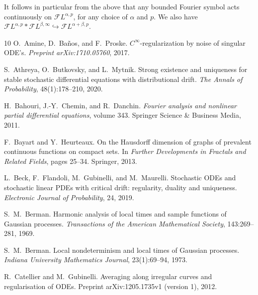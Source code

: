 \documentclass[10pt]{article}
\newcommand{\tmtextit}[1]{{\itshape{#1}}}
\begin{document}
It follows in particular from the above that any bounded Fourier symbol acts
continuously on $\mathcal{F} L^{\alpha, p}$, for any choice of $\alpha$ and
$p$. We also have $\mathcal{F} L^{\alpha, p} \ast \mathcal{F} L^{\beta,
\infty} \hookrightarrow \mathcal{F} L^{\alpha + \beta, p}$.

\begin{thebibliography}{10}
  O.~Amine, D.~Ba{\~n}os, and  F.~Proske.
  {\newblock}$C^{\infty}$-regularization by noise of singular ODE's.
  {\newblock}\tmtextit{Preprint arXiv:1710.05760}, 2017.{\newblock}
  
  S.~Athreya, O.~Butkovsky, and  L.~Mytnik.
  {\newblock}Strong existence and uniqueness for stable stochastic
  differential equations with distributional drift. {\newblock}\tmtextit{The
  Annals of Probability}, 48(1):178--210, 2020.{\newblock}
  
  H.~Bahouri, J.-Y.~Chemin, and  R.~Danchin.
  {\newblock}\tmtextit{Fourier analysis and nonlinear partial differential
  equations},  volume  343. {\newblock}Springer Science \& Business Media,
  2011.{\newblock}
  
  F.~Bayart  and  Y.~Heurteaux. {\newblock}On the Hausdorff
  dimension of graphs of prevalent continuous functions on compact sets.
  {\newblock}In \tmtextit{Further Developments in Fractals and Related
  Fields},  pages  25--34. Springer, 2013.{\newblock}
  
  L.~Beck, F.~Flandoli, M.~Gubinelli, and  M.~Maurelli.
  {\newblock}Stochastic ODEs and stochastic linear PDEs with critical drift:
  regularity, duality and uniqueness. {\newblock}\tmtextit{Electronic Journal
  of Probability}, 24, 2019.{\newblock}
  
  S.~M.~Berman. {\newblock}Harmonic analysis of local
  times and sample functions of Gaussian processes.
  {\newblock}\tmtextit{Transactions of the American Mathematical Society},
  143:269--281, 1969.{\newblock}
  
  S.~M.~Berman. {\newblock}Local nondeterminism and local
  times of Gaussian processes. {\newblock}\tmtextit{Indiana University
  Mathematics Journal}, 23(1):69--94, 1973.{\newblock}
  
  R.~Catellier  and  M.~Gubinelli.
  {\newblock}Averaging along irregular curves and regularisation of ODEs.
  {\newblock}Preprint arXiv:1205.1735v1 (version 1), 2012.{\newblock}
  

\end{thebibliography}
\end{document}
